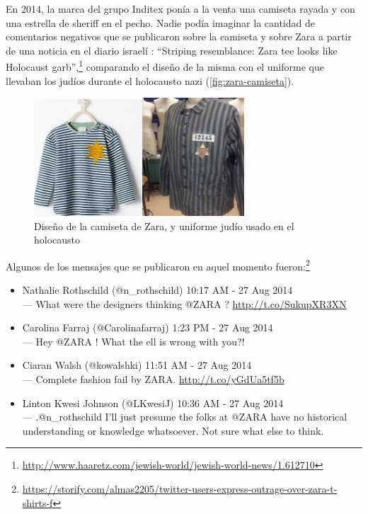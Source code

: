 \begin{example}
En 2014, la marca del grupo Inditex ponía a la venta una camiseta rayada y con una estrella de sheriff en el pecho. Nadie podía imaginar la cantidad de comentarios negativos que se publicaron sobre la camiseta y sobre Zara a partir de una noticia en el diario israelí : ``Striping resemblance: Zara tee looks like Holocaust garb'',\footnote{\url{http://www.haaretz.com/jewish-world/jewish-world-news/1.612710}} comparando el diseño de la misma con el uniforme que llevaban los judíos durante el holocausto nazi (\autoref{fig:zara-camiseta}).

\begin{figure}[htbp]
\centering
\includegraphics[width=0.7\textwidth]{zara-camiseta}
\caption[Diseño de la camiseta de Zara, y uniforme judío en el holocausto]{Diseño de la camiseta de Zara, y uniforme judío usado en el holocausto\footnotemark}
\label{fig:zara-camiseta}
\end{figure}

\newpage
Algunos de los mensajes que se publicaron en aquel momento fueron:\footnote{\url{https://storify.com/almas2205/twitter-users-express-outrage-over-zara-t-shirts-f}}
\begin{itemize}
\item Nathalie Rothschild (@n\_rothschild) 10:17 AM - 27 Aug 2014 \\ --- What were the designers thinking @ZARA ? \url{http://t.co/SukupXR3XN}
\item Carolina Farraj (@Carolinafarraj) 1:23 PM - 27 Aug 2014 \\ --- Hey @ZARA ! What the ell is wrong with you?!
\item Ciaran Walsh (@kowalshki) 11:51 AM - 27 Aug 2014 \\ --- Complete fashion fail by ZARA. \url{http://t.co/yGdUa5tf5b}
\item Linton Kwesi Johnson (@LKwesiJ) 10:36 AM - 27 Aug 2014 \\ --- .@n\_rothschild I'll just presume the folks at @ZARA have no historical understanding or knowledge whatsoever. Not sure what else to think.
\end{itemize}


\end{example}
